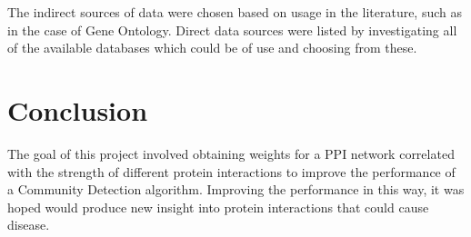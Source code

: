 The indirect sources of data were chosen based on usage in the literature, such as in the case of Gene Ontology\autocite{qi_evaluation_2006}.
Direct data sources were listed by investigating all of the available databases which could be of use and choosing from these.

\section*{Conclusion}

The goal of this project involved obtaining weights for a PPI network correlated with the strength of different protein interactions to improve the performance of a Community Detection algorithm.
Improving the performance in this way, it was hoped would produce new insight into protein interactions that could cause disease.
